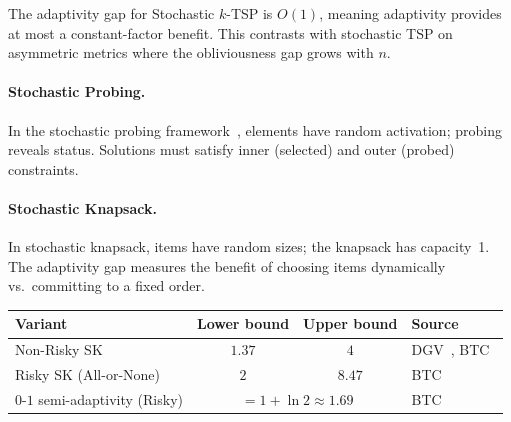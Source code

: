 \begin{remark}
    The adaptivity gap for Stochastic $k$-TSP is $O(1)$, meaning adaptivity provides at most a constant-factor benefit. This contrasts with stochastic TSP on asymmetric metrics where the obliviousness gap grows with $n$.
\end{remark}

\paragraph{Stochastic Probing.}

In the stochastic probing framework~\cite{GuptaNagarajan2013}, elements have random activation; probing reveals status. Solutions must satisfy inner (selected) and outer (probed) constraints.

\begin{center}
\renewcommand{\arraystretch}{1.4}
\end{center}

\paragraph{Stochastic Knapsack.}

In stochastic knapsack, items have random sizes; the knapsack has capacity~1. The adaptivity gap measures the benefit of choosing items dynamically vs.\ committing to a fixed order.

\begin{center}
\renewcommand{\arraystretch}{1.4}
\begin{tabular}{l c c l}
    \hline
    \textbf{Variant} & \textbf{Lower bound} & \textbf{Upper bound} & \textbf{Source} \\
    \hline
    Non-Risky SK & $1.37$ & $4$ & DGV~\cite{DeanGoemansVondrak2008}, BTC~\cite{BarakTalgamCohen2026} \\
    Risky SK (All-or-None) & $2$ & $8.47$ & BTC~\cite{BarakTalgamCohen2026} \\
    $0$-$1$ semi-adaptivity (Risky) & \multicolumn{2}{c}{$= 1 + \ln 2 \approx 1.69$} & BTC~\cite{BarakTalgamCohen2026} \\
    \hline
\end{tabular}
\end{center}

